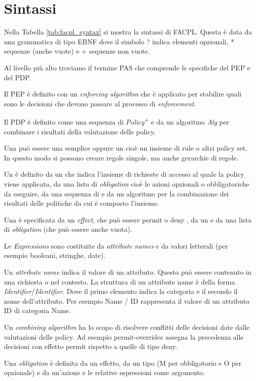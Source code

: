 \section{Sintassi}
\label{sub:Componenti del sistema}
Nella Tabella \ref{tab:facpl_syntax} si mostra la sintassi di \ac{FACPL}. Questa è data da una grammatica di tipo \ac{EBNF} dove il simbolo ? indica
elementi opzionali, * sequenze (anche vuote) e + sequenze non vuote.\par
{\label{Sintassi di FACPL}}
Al livello più alto troviamo il termine  \ac{PAS} che comprende le specifiche del \ac{PEP} e del \ac{PDP}.\par
Il \ac{PEP} è definito con un \emph{enforcing algorithm} che è applicato per stabilire quali sono le decisioni che devono
passare al processo di \emph{enforcement}.\par
Il \ac{PDP} è definito come una sequenza di \emph{Policy}\textsuperscript{+} e da un algoritmo \emph{Alg} per combinare i
risultati della valutazione delle policy.\par
Una \ePolicy può essere una \eRule semplice oppure un \ePolicySet cioè un insieme di rule o altri
policy set. In questo modo si possono creare regole singole, ma anche gerarchie di regole.\par
Un \ePolicySet è definito da un \etarget che indica l'insieme di richieste di accesso al quale la policy
viene applicata, da una lista di \emph{obligation} cioè le azioni opzionali o obbligatoriche da eseguire, da una
sequenza di \ePolicy e da un algoritmo per la combinazione dei risultati delle politiche da cui è composto l'insieme.\par
Una \eRule  è specificata da un \emph{effect}, che può essere permit o deny , da un \etarget
e da una lista di \emph{obligation} (che può essere anche vuota). \par
Le \emph{Expressions} sono costituite da \emph{attribute names} e da valori letterali (per esempio booleani, stringhe, date).\par
Un \emph{attribute name} indica il valore di un attributo. Questo può essere contenuto in una richiesta o nel contesto. La
struttura di un attribute name è della forma \emph{Identifier}/\emph{Identifier}. Dove il primo elemento indica la categoria
e il secondo il nome dell'attributo. Per esempio Name / ID rappresenta il valore di un attributo ID di categoria Name.\par
Un \emph{combining algorithm} ha lo scopo di risolvere conflitti delle decisioni date dalle valutazioni delle policy.
Ad esempio permit-overrides assegna la precedenza alle decisioni con effetto permit rispetto a quelle di tipo deny.\par
Una \emph{obligation} è definita da un effetto, da un tipo (M per obbligatorio e O per opzionale) e da un'azione e le relative
espressioni come argomento.\par

